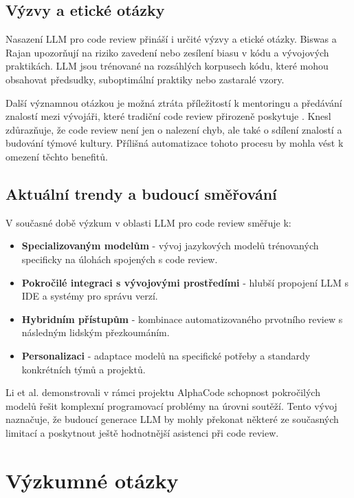 \documentclass[12pt, a4paper]{article}
\begin{document}
\subsection{Výzvy a etické otázky}

Nasazení LLM pro code review přináší i určité výzvy a etické otázky. Biswas a Rajan \cite{biswas2022} upozorňují na riziko zavedení nebo zesílení biasu v kódu a vývojových praktikách. LLM jsou trénované na rozsáhlých korpusech kódu, které mohou obsahovat předsudky, suboptimální praktiky nebo zastaralé vzory.

Další významnou otázkou je možná ztráta příležitostí k mentoringu a předávání znalostí mezi vývojáři, které tradiční code review přirozeně poskytuje \cite{zdrojak2022}. Knesl zdůrazňuje, že code review není jen o nalezení chyb, ale také o sdílení znalostí a budování týmové kultury. Přílišná automatizace tohoto procesu by mohla vést k omezení těchto benefitů.

\subsection{Aktuální trendy a budoucí směřování}

V současné době výzkum v oblasti LLM pro code review směřuje k:

\begin{itemize}
    \item \textbf{Specializovaným modelům} - vývoj jazykových modelů trénovaných specificky na úlohách spojených s code review.
    \item \textbf{Pokročilé integraci s vývojovými prostředími} - hlubší propojení LLM s IDE a systémy pro správu verzí.
    \item \textbf{Hybridním přístupům} - kombinace automatizovaného prvotního review s následným lidským přezkoumáním.
    \item \textbf{Personalizaci} - adaptace modelů na specifické potřeby a standardy konkrétních týmů a projektů.
\end{itemize}

Li et al. \cite{li2022} demonstrovali v rámci projektu AlphaCode schopnost pokročilých modelů řešit komplexní programovací problémy na úrovni soutěží. Tento vývoj naznačuje, že budoucí generace LLM by mohly překonat některé ze současných limitací a poskytnout ještě hodnotnější asistenci při code review.




\section{Výzkumné otázky}
\end{document}
